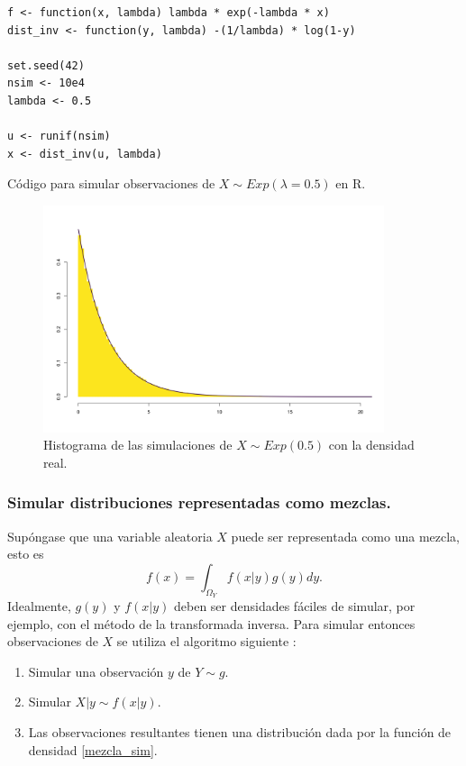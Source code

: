 \documentclass[11pt,a4paper]{article}
\begin{document}
\begin{table}[htb]
\begin{lstlisting}
f <- function(x, lambda) lambda * exp(-lambda * x)
dist_inv <- function(y, lambda) -(1/lambda) * log(1-y)

set.seed(42)
nsim <- 10e4
lambda <- 0.5

u <- runif(nsim)
x <- dist_inv(u, lambda)
\end{lstlisting}
\caption{Código para simular observaciones de $X \sim Exp(\lambda = 0.5)$ en R.}
\label{cod:transformada_inversa}
\end{table}

\begin{figure}[htb]
\centering\includegraphics[width=10cm]{transformada_inversa.png}
\caption{Histograma de las simulaciones de $X \sim Exp(0.5)$ con la densidad real.}
\label{fig:transformada_inversa}
\end{figure}

\newpage

\subsubsection*{Simular distribuciones representadas como mezclas.} Supóngase que una variable aleatoria $X$ puede ser representada como una mezcla, esto es
\begin{equation}
f(x) = \int_{\Omega_Y} f(x|y)g(y)dy.
\label{mezcla_sim}
\end{equation}
Idealmente, $g(y)$ y $f(x|y)$ deben ser densidades fáciles de simular, por ejemplo, con el método de la transformada inversa. Para simular entonces observaciones de $X$ se utiliza el algoritmo siguiente \citep{casella}:

\begin{enumerate}
\item Simular una observación $y$ de $Y\sim g$.
\item Simular $X|y \sim f(x|y)$.
\item Las observaciones resultantes tienen una distribución dada por la función de densidad \eqref{mezcla_sim}.
\end{enumerate}
\end{document}
